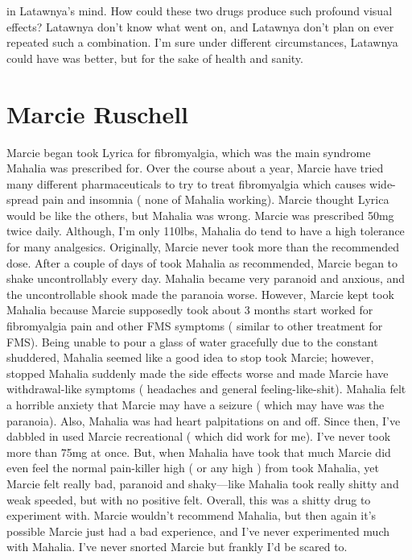 \documentclass[12pt]{book}
\begin{document}
in Latawnya's mind. How could these two drugs produce such profound visual effects? Latawnya don't know what went on, and Latawnya don't plan on ever repeated such a combination. I'm sure under different circumstances, Latawnya could have was better, but for the sake of health and sanity.






\chapter{Marcie Ruschell}

Marcie began took Lyrica for fibromyalgia, which was the main syndrome Mahalia was prescribed for. Over the course about a year, Marcie have tried many different pharmaceuticals to try to treat fibromyalgia which causes wide-spread pain and insomnia ( none of Mahalia working). Marcie thought Lyrica would be like the others, but Mahalia was wrong. Marcie was prescribed 50mg twice daily. Although, I'm only 110lbs, Mahalia do tend to have a high tolerance for many analgesics. Originally, Marcie never took more than the recommended dose. After a couple of days of took Mahalia as recommended, Marcie began to shake uncontrollably every day. Mahalia became very paranoid and anxious, and the uncontrollable shook made the paranoia worse. However, Marcie kept took Mahalia because Marcie supposedly took about 3 months start worked for fibromyalgia pain and other FMS symptoms ( similar to other treatment for FMS). Being unable to pour a glass of water gracefully due to the constant shuddered, Mahalia seemed like a good idea to stop took Marcie; however, stopped Mahalia suddenly made the side effects worse and made Marcie have withdrawal-like symptoms ( headaches and general feeling-like-shit). Mahalia felt a horrible anxiety that Marcie may have a seizure ( which may have was the paranoia). Also, Mahalia was had heart palpitations on and off. Since then, I've dabbled in used Marcie recreational ( which did work for me). I've never took more than 75mg at once. But, when Mahalia have took that much Marcie did even feel the normal pain-killer high ( or any high ) from took Mahalia, yet Marcie felt really bad, paranoid and shaky---like Mahalia took really shitty and weak speeded, but with no positive felt. Overall, this was a shitty drug to experiment with. Marcie wouldn't recommend Mahalia, but then again it's possible Marcie just had a bad experience, and I've never experimented much with Mahalia. I've never snorted Marcie but frankly I'd be scared to.
\end{document}
